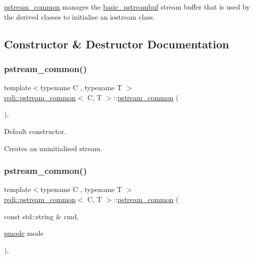 \mbox{\hyperlink{classredi_1_1pstream__common}{pstream\+\_\+common}} manages the \mbox{\hyperlink{classredi_1_1basic__pstreambuf}{basic\+\_\+pstreambuf}} stream buffer that is used by the derived classes to initialise an iostream class. 

\subsection{Constructor \& Destructor Documentation}
\mbox{\label{classredi_1_1pstream__common_a14266d3a2f7089ed99d5537a6a1d9831}} 
\subsubsection{\texorpdfstring{pstream\+\_\+common()}{pstream\_common()}\hspace{0.1cm}{\footnotesize\ttfamily [1/3]}}
{\footnotesize\ttfamily template$<$typename C , typename T $>$ \\
\mbox{\hyperlink{classredi_1_1pstream__common}{redi\+::pstream\+\_\+common}}$<$ C, T $>$\+::\mbox{\hyperlink{classredi_1_1pstream__common}{pstream\+\_\+common}} (\begin{DoxyParamCaption}{ }\end{DoxyParamCaption})\hspace{0.3cm}{\ttfamily [inline]}, {\ttfamily [protected]}}



Default constructor. 

Creates an uninitialised stream.\mbox{\label{classredi_1_1pstream__common_a41a3cff7a8743a81b2d6e1e6051f3d30}} 
\subsubsection{\texorpdfstring{pstream\+\_\+common()}{pstream\_common()}\hspace{0.1cm}{\footnotesize\ttfamily [2/3]}}
{\footnotesize\ttfamily template$<$typename C , typename T $>$ \\
\mbox{\hyperlink{classredi_1_1pstream__common}{redi\+::pstream\+\_\+common}}$<$ C, T $>$\+::\mbox{\hyperlink{classredi_1_1pstream__common}{pstream\+\_\+common}} (\begin{DoxyParamCaption}\item[{const std\+::string \&}]{cmd,  }\item[{\mbox{\hyperlink{structredi_1_1pstreams_a1eae4aad88812af03a0fbb3ec13c50b7}{pmode}}}]{mode }\end{DoxyParamCaption})\hspace{0.3cm}{\ttfamily [inline]}, {\ttfamily [protected]}}



